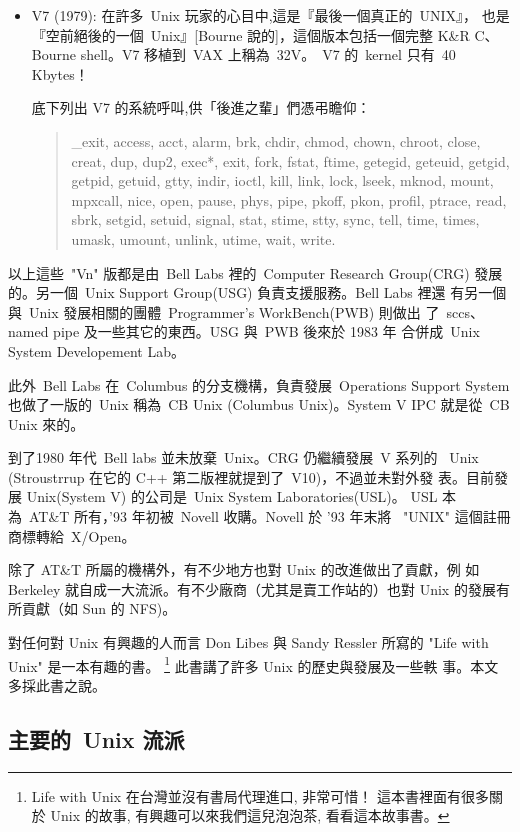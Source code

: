 \documentclass{article}
\begin{document}
\begin{CJK*}{Bg5}{ming}
\begin{itemize}
    \item V7 (1979):  在許多~Unix 玩家的心目中,這是『最後一個真正的~UNIX』，
        也是『空前絕後的一個~Unix』[Bourne 說的]，這個版本包括一個完整
        K\&R C、Bourne shell。V7 移植到~VAX 上稱為~32V。~V7 的~kernel 
        只有~40 Kbytes！
    
    底下列出 V7 的系統呼叫,供「後進之輩」們憑弔瞻仰：
	\begin{quote}
        \_exit, access, acct, alarm, brk, chdir, chmod, chown,
        chroot, close, creat, dup, dup2, exec*, exit, fork, fstat,
        ftime, getegid, geteuid, getgid, getpid, getuid, gtty,
        indir, ioctl, kill, link, lock, lseek, mknod, mount,
        mpxcall, nice, open, pause, phys, pipe, pkoff, pkon,
        profil, ptrace, read, sbrk, setgid, setuid, signal, stat,
        stime, stty, sync, tell, time, times, umask, umount,
        unlink, utime, wait, write.
	\end{quote}
\end{itemize}
    以上這些~"Vn" 版都是由~Bell Labs 裡的~Computer Research Group(CRG) 
    發展的。另一個~Unix Support Group(USG) 負責支援服務。Bell Labs 裡還
    有另一個與~Unix 發展相關的團體~Programmer's WorkBench(PWB) 則做出
    了~sccs、named pipe 及一些其它的東西。USG 與~PWB 後來於 1983 年
    合併成~Unix System Developement Lab。

    此外~Bell Labs 在~Columbus 的分支機構，負責發展~Operations Support 
    System 也做了一版的~Unix 稱為~CB Unix (Columbus Unix)。System V IPC 
    就是從~CB Unix 來的。

    到了1980 年代~Bell labs 並未放棄~Unix。CRG 仍繼續發展~V 系列的
    ~Unix (Stroustrrup 在它的 C++ 第二版裡就提到了~V10)，不過並未對外發
    表。目前發展 Unix(System V) 的公司是~Unix System Laboratories(USL)。
    USL 本為~AT\&T 所有，'93 年初被~Novell 收購。Novell 於 '93 年末將
    ~"UNIX" 這個註冊商標轉給~X/Open。

    除了 AT\&T 所屬的機構外，有不少地方也對 Unix 的改進做出了貢獻，例
    如 Berkeley 就自成一大流派。有不少廠商（尤其是賣工作站的）也對 Unix 
    的發展有所貢獻（如 Sun 的 NFS)。
    
    對任何對 Unix 有興趣的人而言 Don Libes 與 Sandy Ressler 所寫的 "Life
    with Unix" 是一本有趣的書。
    \footnote{Life with Unix 在台灣並沒有書局代理進口, 非常可惜！
       這本書裡面有很多關於 Unix 的故事, 有興趣可以來我們這兒泡泡茶,
       看看這本故事書。} 此書講了許多 Unix 的歷史與發展及一些軼
    事。本文多採此書之說。

\subsection{主要的~Unix 流派}


\end{CJK*}
\end{document}
